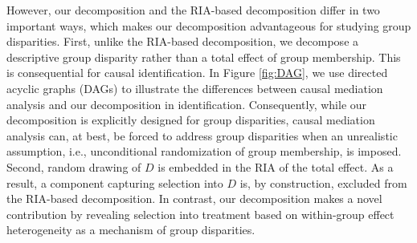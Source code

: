 \documentclass[12pt,a4paper]{article}
\begin{document}
However, our decomposition and the RIA-based decomposition differ in two important ways, which makes our decomposition advantageous for studying group disparities. First, unlike the RIA-based decomposition, we decompose a descriptive group disparity rather than a total effect of group membership. This is consequential for causal identification. In Figure \ref{fig:DAG}, we use directed acyclic graphs (DAGs) to illustrate the differences between causal mediation analysis and our decomposition in identification. Consequently, while our decomposition is explicitly designed for group disparities, causal mediation analysis can, at best, be forced to address group disparities when an unrealistic assumption, i.e., unconditional randomization of group membership, is imposed.
Second, random drawing of $D$ is embedded in the RIA of the total effect. As a result, a component capturing selection into $D$ is, by construction, excluded from the RIA-based decomposition. In contrast, our decomposition makes a novel contribution by revealing selection into treatment based on within-group effect heterogeneity as a mechanism of group disparities.
\end{document}
